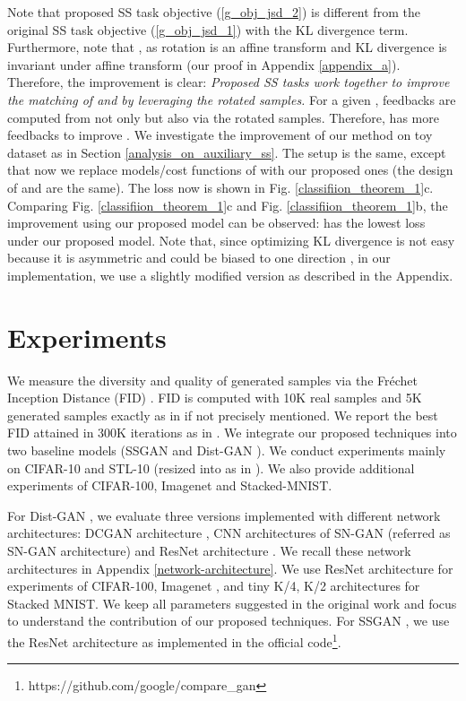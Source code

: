 \documentclass{article}
\begin{document}
Note that proposed SS task objective (\ref{g_obj_jsd_2}) is different from the original SS task objective (\ref{g_obj_jsd_1}) with the KL divergence term.
Furthermore, note that , as rotation  is an affine transform and KL divergence is invariant under affine transform (our proof in Appendix \ref{appendix_a}).
Therefore, the improvement is clear: {\em Proposed SS tasks  work together to improve the matching of  and  by leveraging the rotated samples.} For a given , feedbacks are computed from not only   but also  via the rotated samples. Therefore,  has more feedbacks to improve . We investigate the improvement of our method on toy dataset as in Section \ref{analysis_on_auxiliary_ss}. The setup is the same, except that now we replace models/cost functions of  with our proposed ones  (the design of  and  are the same). The loss now is shown in Fig. \ref{classifiion_theorem_1}c. Comparing Fig. \ref{classifiion_theorem_1}c and Fig. \ref{classifiion_theorem_1}b, the improvement using our proposed model can be observed:  has the lowest loss under our proposed model. Note that, since optimizing KL divergence is not easy because it is asymmetric and could be biased to one direction \cite{tu-nips-2017}, in our implementation, we use a slightly modified version as described in the Appendix.  
\section{Experiments}

We measure the diversity and quality of generated samples via the Fr\'echet Inception Distance (FID) \cite{heusel-arxiv-2017}. FID is computed with 10K real samples and 5K generated samples exactly as in \cite{miyato-iclr-2018} if not precisely mentioned. 
We report the best FID attained in 300K iterations as in \cite{xiang-arxiv-2017, li-nips-2017, tran-eccv-2018, yazici-arxiv-2018}.
We integrate our proposed techniques into two baseline models (SSGAN \cite{chen-arxiv-2018} and Dist-GAN \cite{tran-eccv-2018}). We conduct experiments mainly on CIFAR-10 and STL-10 (resized into  as in \cite{miyato-iclr-2018}). We also provide additional experiments of CIFAR-100, Imagenet  and Stacked-MNIST.

For Dist-GAN \cite{tran-eccv-2018}, we evaluate three versions implemented with different network architectures: DCGAN architecture \cite{radford-arxiv-2015}, CNN architectures of SN-GAN \cite{miyato-iclr-2018} (referred as SN-GAN architecture) and ResNet architecture \cite{gulrajani-arxiv-2017}. We recall these network architectures in Appendix \ref{network-architecture}. We use ResNet architecture \cite{gulrajani-arxiv-2017} for experiments of CIFAR-100, Imagenet , and tiny K/4, K/2 architectures \cite{metz-arxiv-2016} for Stacked MNIST. We keep all parameters suggested in the original work and focus to understand the contribution of our proposed techniques. For SSGAN \cite{chen-arxiv-2018}, we use the ResNet architecture as implemented in the official code\footnote{https://github.com/google/compare\_gan}.
\end{document}
